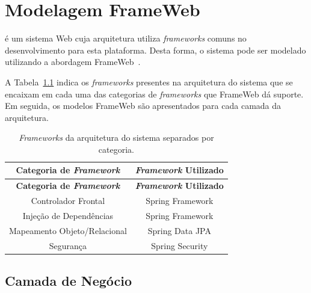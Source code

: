 
\chapter{Modelagem FrameWeb}
\label{sec-frameweb}
\vspace{-1cm}

\emph{\imprimirtitulo} é um sistema Web cuja arquitetura utiliza \textit{frameworks} comuns no desenvolvimento para esta plataforma. Desta forma, o sistema pode ser modelado utilizando a abordagem FrameWeb~\cite{souza-celebratingfalbo20}.

A Tabela~\ref{tabela-frameworks} indica os \textit{frameworks} presentes na arquitetura do sistema que se encaixam em cada uma das categorias de \textit{frameworks} que FrameWeb dá suporte. Em seguida, os modelos FrameWeb são apresentados para cada camada da arquitetura.


\begin{footnotesize}
	\begin{longtable}{|c|c|}
		\caption{\textit{Frameworks} da arquitetura do sistema separados por categoria.}
		\label{tabela-frameworks}\\\hline
		
		\rowcolor{lightgray}
		\textbf{Categoria de \textit{Framework}} & \textbf{\textit{Framework} Utilizado} \\\hline 
		\endfirsthead
		\hline
		\rowcolor{lightgray}
		\textbf{Categoria de \textit{Framework}} & \textbf{\textit{Framework} Utilizado} \\\hline 
		\endhead

		Controlador Frontal & Spring Framework \\\hline

		Injeção de Dependências & Spring Framework \\\hline

		Mapeamento Objeto/Relacional & Spring Data JPA \\\hline

		Segurança & Spring Security \\\hline
	\end{longtable}
\end{footnotesize}




\section{Camada de Negócio}
\label{sec-frameweb-negocio}

